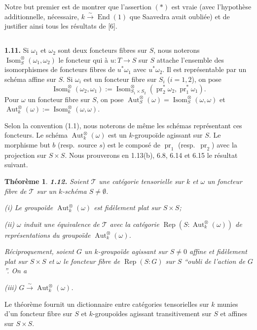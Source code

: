 \documentclass[12pt,a4paper]{article}
\theoremstyle{plain}
\newtheorem{theorem}{Théorème}[section]
\theoremstyle{definition}
\theoremstyle{remark}
\DeclareMathOperator{\End}{End}
\DeclareMathOperator{\Aut}{Aut}
\DeclareMathOperator{\Isom}{Isom}
\DeclareMathOperator{\pr}{pr}
\DeclareMathOperator{\Rep}{Rep}
\begin{document}
Notre but premier est de montrer que l'assertion $(*)$ est vraie (avec l'hypothèse additionnelle, nécessaire, $k \xrightarrow{\sim} \End(1)$ que Saavedra avait oubliée) et de justifier ainsi tous les résultats de [6].

\subsection{}

\textbf{1.11.} Si $\omega_1$ et $\omega_2$ sont deux foncteurs fibres sur $S$, nous noterons $\Isom^\otimes_S(\omega_1,\omega_2)$ le foncteur qui à $u : T \to S$ sur $S$ attache l'ensemble des isomorphismes de foncteurs fibres de $u^*\omega_1$ avec $u^*\omega_2$. Il est représentable par un schéma affine sur $S$. Si $\omega_i$ est un foncteur fibre sur $S_i$ ($i = 1,2$), on pose
\[
\Isom^\otimes_k(\omega_2,\omega_1) := \Isom^\otimes_{S_1 \times S_2}(\pr_2^*\omega_2, \pr_1^*\omega_1).
\]
Pour $\omega$ un foncteur fibre sur $S$, on pose $\Aut^\otimes_S(\omega) = \Isom^\otimes_S(\omega,\omega)$ et $\Aut^\otimes_k(\omega) := \Isom^\otimes_k(\omega,\omega)$.

Selon la convention (1.1), nous noterons de même les schémas représentant ces foncteurs. Le schéma $\Aut^\otimes_k(\omega)$ est un $k$-groupoïde agissant sur $S$. Le morphisme but $b$ (resp.~source $s$) est le composé de $\pr_1$ (resp.~$\pr_2$) avec la projection sur $S \times S$. Nous prouverons en 1.13(b), 6.8, 6.14 et 6.15 le résultat suivant.

\begin{theorem}
\textbf{1.12.} Soient $\mathcal{T}$ une catégorie tensorielle sur $k$ et $\omega$ un foncteur fibre de $\mathcal{T}$ sur un $k$-schéma $S \neq \emptyset$.

\emph{(i)} Le groupoïde $\Aut^\otimes_k(\omega)$ est fidèlement plat sur $S \times S$;

\emph{(ii)} $\omega$ induit une équivalence de $\mathcal{T}$ avec la catégorie $\Rep(S:\Aut^\otimes_k(\omega))$ de représentations du groupoïde $\Aut^\otimes_k(\omega)$.

Réciproquement, soient $G$ un $k$-groupoïde agissant sur $S \neq 0$ affine et fidèlement plat sur $S \times S$ et $\omega$ le foncteur fibre de $\Rep(S:G)$ sur $S$ ``oubli de l'action de $G$''. On a

\emph{(iii)} $G \xrightarrow{\sim} \Aut^\otimes_k(\omega)$.
\end{theorem}

Le théorème fournit un dictionnaire entre catégories tensorielles sur $k$ munies d'un foncteur fibre sur $S$ et $k$-groupoïdes agissant transitivement sur $S$ et affines sur $S \times S$.
\end{document}
